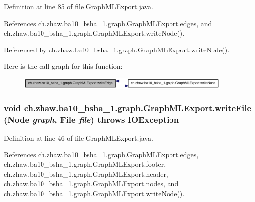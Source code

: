 Definition at line 85 of file GraphMLExport.java.

References ch.zhaw.ba10\_\-bsha\_\-1.graph.GraphMLExport.edges, and ch.zhaw.ba10\_\-bsha\_\-1.graph.GraphMLExport.writeNode().

Referenced by ch.zhaw.ba10\_\-bsha\_\-1.graph.GraphMLExport.writeNode().

Here is the call graph for this function:\nopagebreak
\begin{figure}[H]
\begin{center}
\leavevmode
\includegraphics[width=298pt]{classch_1_1zhaw_1_1ba10__bsha__1_1_1graph_1_1GraphMLExport_aafa9816a624b6f1f332dae553c543f39_cgraph}
\end{center}
\end{figure}
\hypertarget{classch_1_1zhaw_1_1ba10__bsha__1_1_1graph_1_1GraphMLExport_a5ca63fefbff43c1591da29d3529144cb}{
\subsubsection[{writeFile}]{\setlength{\rightskip}{0pt plus 5cm}void ch.zhaw.ba10\_\-bsha\_\-1.graph.GraphMLExport.writeFile ({\bf Node} {\em graph}, \/  File {\em file})  throws IOException }}
\label{classch_1_1zhaw_1_1ba10__bsha__1_1_1graph_1_1GraphMLExport_a5ca63fefbff43c1591da29d3529144cb}


Definition at line 46 of file GraphMLExport.java.

References ch.zhaw.ba10\_\-bsha\_\-1.graph.GraphMLExport.edges, ch.zhaw.ba10\_\-bsha\_\-1.graph.GraphMLExport.footer, ch.zhaw.ba10\_\-bsha\_\-1.graph.GraphMLExport.header, ch.zhaw.ba10\_\-bsha\_\-1.graph.GraphMLExport.nodes, and ch.zhaw.ba10\_\-bsha\_\-1.graph.GraphMLExport.writeNode().

